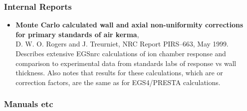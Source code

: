 \subsubsection{Internal Reports}
\begin{itemize}
\item {\bfseries Monte Carlo calculated wall and axial non-uniformity
     corrections for primary standards of air kerma},\\
D. W. O.  Rogers and J. Treurniet, NRC Report PIRS--663, May 1999.\\Describes extensive EGSnrc
calculations of ion chamber response and comparison to experimental data
from standards labs of response vs wall thickness. Also notes that results
for these calculations, which are or correction factors, are the same as
for EGS4/PRESTA calculations.
\end{itemize}

\subsubsection{Manuals etc}

